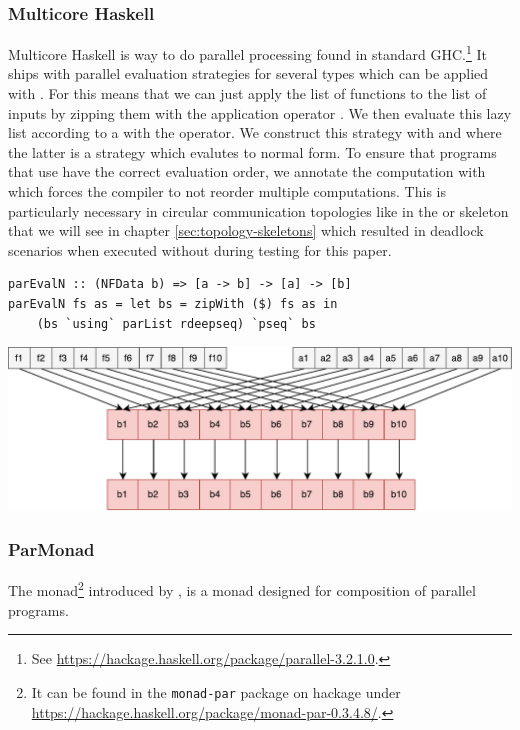 \subsubsection{Multicore Haskell}
Multicore Haskell \cite{Marlow2009} is way to do parallel processing found in standard GHC.\footnote{See \url{https://hackage.haskell.org/package/parallel-3.2.1.0}.} It ships with parallel evaluation strategies for several types which can be applied with . For  this means that we can just apply the list of functions \code{[a -> b]} to the list of inputs \code{[a]} by zipping them with the application operator \code{\$}. We then evaluate this lazy list \code{[b]} according to a  with the  operator. We construct this strategy with  and  where the latter is a strategy which evalutes to normal form. To ensure that programs that use  have the correct evaluation order, we annotate the computation with  which forces the compiler to not reorder multiple  computations. This is particularly necessary in circular communication topologies like in the  or  skeleton that we will see in chapter \ref{sec:topology-skeletons} which resulted in deadlock scenarios when executed without  during testing for this paper.

\begin{lstlisting}[frame=htrbl]
parEvalN :: (NFData b) => [a -> b] -> [a] -> [b]
parEvalN fs as = let bs = zipWith ($) fs as in
	(bs `using` parList rdeepseq) `pseq` bs
\end{lstlisting}
\begin{center}
	\includegraphics[scale=0.5]{images/parEvalNMulticore}
\end{center} %

\subsubsection{ParMonad}
The  monad\footnote{It can be found in the \texttt{monad-par} package on hackage under \url{https://hackage.haskell.org/package/monad-par-0.3.4.8/}.} introduced by \citet{monad_par_paper_2011}, is a monad designed for composition of parallel programs.


